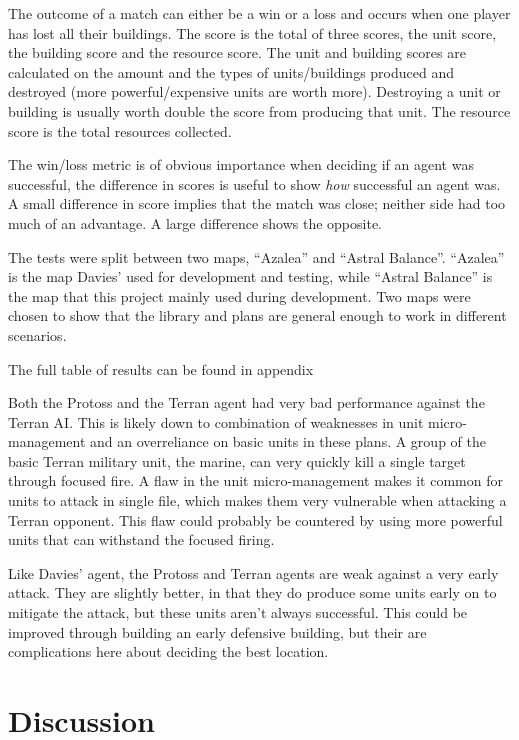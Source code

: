 \documentclass[11pt,openright,a4paper]{report}
\begin{document}
The outcome of a match can either be a win or a loss and occurs when one player has lost all their buildings. The score is the total of three scores, the unit score, the building score and the resource score. The unit and building scores are calculated on the amount and the types of units/buildings produced and destroyed (more powerful/expensive units are worth more). Destroying a unit or building is usually worth double the score from producing that unit. The resource score is the total resources collected.

The win/loss metric is of obvious importance when deciding if an agent was successful, the difference in scores is useful to show \textit{how} successful an agent was. A small difference in score implies that the match was close; neither side had too much of an advantage. A large difference shows the opposite.

The tests were split between two maps, ``Azalea'' and ``Astral Balance''. ``Azalea'' is the map Davies' used for development and testing, while ``Astral Balance'' is the map that this project mainly used during development. Two maps were chosen to show that the library and plans are general enough to work in different scenarios. 

The full table of results can be found in appendix 




Both the Protoss and the Terran agent had very bad performance against the Terran AI. This is likely down to combination of weaknesses in unit micro-management and an overreliance on basic units in these plans. A group of the basic Terran military unit, the marine, can very quickly kill  a single target through focused fire. A flaw in the unit micro-management makes it common for units to attack in single file, which makes them very vulnerable when attacking a Terran opponent. This flaw could probably be countered by using more powerful units that can withstand the focused firing.

Like Davies' agent, the Protoss and Terran agents are weak against a very early attack. They are slightly better, in that they do produce some units early on to mitigate the attack, but these units aren't always successful. This could be improved through building an early defensive building, but their are complications here about deciding the best location.



\chapter{Discussion}
\end{document}
